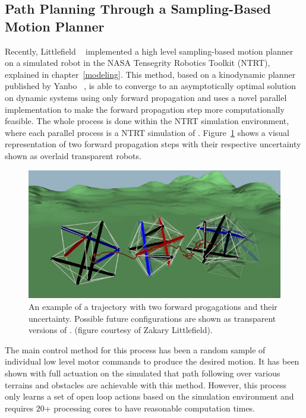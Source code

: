 \subsection{Path Planning Through a Sampling-Based Motion Planner}
\label{sec:belief}

Recently, Littlefield \etal~\cite{littlefieldintegrating} implemented a high level sampling-based motion planner on a simulated \SB{} robot in the NASA Tensegrity Robotics Toolkit (NTRT), explained in chapter~\ref{modeling}.
This method, based on a kinodynamic planner published by Yanbo \etal~\cite{li2016asymptotically}, is able to converge to an asymptotically optimal solution on dynamic systems using only forward propagation and uses a novel parallel implementation to make the forward propagation step more computationally feasible.
The whole process is done within the NTRT simulation environment, where each parallel process is a NTRT simulation of \SB{}.
Figure~\ref{fig:particles} shows a visual representation of two forward propagation steps with their respective uncertainty shown as overlaid transparent robots.

\begin{figure}[thpb]
    \centering
    \includegraphics[width=\linewidth]{tex/img/particles}
    \caption{
        \label{fig:particles}
        An  example of a trajectory with two forward progagations and their uncertainty. 
        Possible future configurations are shown as transparent versions of \SB{}.
        (figure courtesy of Zakary Littlefield).
            }
\end{figure}

The main control method for this process has been a random sample of individual low level motor commands to produce the desired motion.
It has been shown with full actuation on the simulated \SB{} that path following over various terrains and obstacles are achievable with this method.
However, this process only learns a set of open loop actions based on the simulation environment and requires \(20\)+ processing cores to have reasonable computation times.

